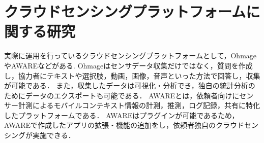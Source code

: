 \section{クラウドセンシングプラットフォームに関する研究}
\label{sec:style}
実際に運用を行っているクラウドセンシングプラットフォームとして，Ohmage\cite{Tangmunarunkit}\cite{ohmage}やAWARE\cite{Ferreira}\cite{AWARE}などがある.
Ohmageはセンサデータ収集だけではなく，質問を作成し，協力者にテキストや選択肢，動画，画像，音声といった方法で回答し，収集が可能である．
また，収集したデータは可視化・分析でき，独自の統計分析のためにデータのエクスポートも可能である．
AWAREとは，依頼者向けにセンサー計測によるモバイルコンテキスト情報の計測，推測，ログ記録，共有に特化したプラットフォームである．
AWAREはプラグインが可能であるため，AWAREで作成したアプリの拡張・機能の追加をし，依頼者独自のクラウドセンシングが実施できる．

